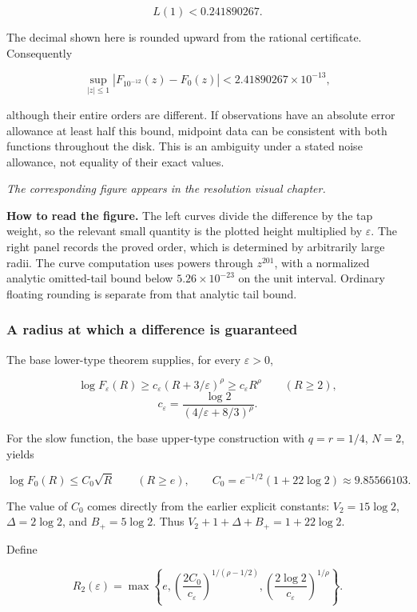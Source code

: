 \[
L(1)<0.241890267.
\]

The decimal shown here is rounded upward from the rational certificate.
Consequently

\[
\boxed{\sup_{|z|\le1}|F_{10^{-12}}(z)-F_0(z)|<2.41890267\times10^{-13},}
\]

although their entire orders are different. If observations have an
absolute error allowance at least half this bound, midpoint data can be
consistent with both functions throughout the disk. This is an ambiguity
under a stated noise allowance, not equality of their exact values.

\emph{The corresponding figure appears in the resolution visual
chapter.}

\textbf{How to read the figure.} The left curves divide the difference
by the tap weight, so the relevant small quantity is the plotted height
multiplied by \(\varepsilon\). The right panel records the proved order,
which is determined by arbitrarily large radii. The curve computation
uses powers through \(z^{201}\), with a normalized analytic omitted-tail
bound below \(5.26\times10^{-23}\) on the unit interval. Ordinary
floating rounding is separate from that analytic tail bound.

\hypertarget{v11-resolution_full-a-radius-at-which-a-difference-is-guaranteed}{%
\subsubsection{A radius at which a difference is
guaranteed}\label{v11-resolution_full-a-radius-at-which-a-difference-is-guaranteed}}

The base lower-type theorem supplies, for every \(\varepsilon>0\),

\[
\log F_\varepsilon(R)\ge c_\varepsilon(R+3/\varepsilon)^\rho
\ge c_\varepsilon R^\rho\qquad(R\ge2),
\] \[
c_\varepsilon=\frac{\log2}{(4/\varepsilon+8/3)^\rho}.
\]

For the slow function, the base upper-type construction with
\(q=r=1/4\), \(N=2\), yields

\[
\log F_0(R)\le C_0\sqrt R\qquad(R\ge e),
\qquad C_0=e^{-1/2}(1+22\log2)\approx9.85566103.
\]

The value of \(C_0\) comes directly from the earlier explicit constants:
\(V_2=15\log2\), \(\Delta=2\log2\), and \(B_+=5\log2\). Thus
\(V_2+1+\Delta+B_+=1+22\log2\).

Define

\[
R_2(\varepsilon)=\max\left\{
 e,\left(\frac{2C_0}{c_\varepsilon}\right)^{1/(\rho-1/2)},
 \left(\frac{2\log2}{c_\varepsilon}\right)^{1/\rho}\right\}.
\tag{RA-3}
\]

